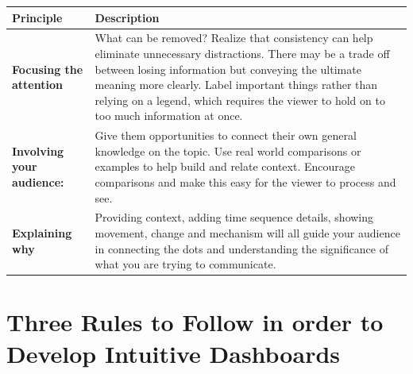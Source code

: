 \documentclass[]{book}
\theoremstyle{definition}
\theoremstyle{definition}
\theoremstyle{definition}
\theoremstyle{remark}
\begin{document}
\begin{longtable}[]{@{}ll@{}}
\toprule
\begin{minipage}[b]{0.16\columnwidth}\raggedright\strut
\textbf{Principle}\strut
\end{minipage} & \begin{minipage}[b]{0.78\columnwidth}\raggedright\strut
\textbf{Description}\strut
\end{minipage}\tabularnewline
\midrule
\endhead
\begin{minipage}[t]{0.16\columnwidth}\raggedright\strut
\textbf{Focusing the attention}\strut
\end{minipage} & \begin{minipage}[t]{0.78\columnwidth}\raggedright\strut
What can be removed? Realize that consistency can help eliminate
unnecessary distractions. There may be a trade off between losing
information but conveying the ultimate meaning more clearly. Label
important things rather than relying on a legend, which requires the
viewer to hold on to too much information at once.\strut
\end{minipage}\tabularnewline
\begin{minipage}[t]{0.16\columnwidth}\raggedright\strut
\textbf{Involving your audience:}\strut
\end{minipage} & \begin{minipage}[t]{0.78\columnwidth}\raggedright\strut
Give them opportunities to connect their own general knowledge on the
topic. Use real world comparisons or examples to help build and relate
context. Encourage comparisons and make this easy for the viewer to
process and see.\strut
\end{minipage}\tabularnewline
\begin{minipage}[t]{0.16\columnwidth}\raggedright\strut
\textbf{Explaining why}\strut
\end{minipage} & \begin{minipage}[t]{0.78\columnwidth}\raggedright\strut
Providing context, adding time sequence details, showing movement,
change and mechanism will all guide your audience in connecting the dots
and understanding the significance of what you are trying to
communicate.\strut
\end{minipage}\tabularnewline
\bottomrule
\end{longtable}

\section{Three Rules to Follow in order to Develop Intuitive
Dashboards}\label{three-rules-to-follow-in-order-to-develop-intuitive-dashboards}
\end{document}
